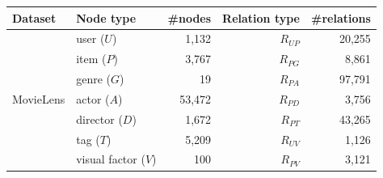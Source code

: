 \begin{table}[h]
\centering
\begin{tabular}{llrrr}
\hline
Dataset & Node type & \#nodes & Relation type & \#relations \\
\hline
& user ($U$) & 1,132 & $R_{UP}$ & 20,255 \\
& item ($P$) & 3,767 & $R_{PG}$ & 8,861 \\
& genre ($G$) & 19 & $R_{PA}$ & 97,791 \\
MovieLens & actor ($A$) & 53,472 & $R_{PD}$ & 3,756 \\
& director ($D$) & 1,672 & $R_{PT}$ & 43,265 \\
& tag ($T$) & 5,209 & $R_{UV}$ & 1,126 \\
& visual factor ($V$) & 100 & $R_{PV}$ & 3,121 \\
\hline
\end{tabular}
\end{table}
